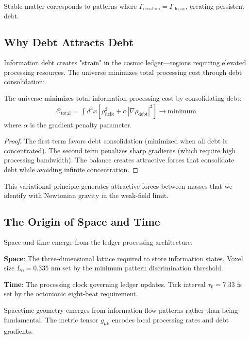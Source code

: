 \documentclass[12pt]{article}
\begin{document}
Stable matter corresponds to patterns where $\Gamma_{\text{creation}} = \Gamma_{\text{decay}}$, creating persistent debt.

\subsection{Why Debt Attracts Debt}

Information debt creates "strain" in the cosmic ledger—regions requiring elevated processing resources. The universe minimizes total processing cost through debt consolidation:

\begin{theorem}
The universe minimizes total information processing cost by consolidating debt:
\begin{align}
\mathcal{C}_{\text{total}} = \int d^3x \left[ \rho_{\text{debt}}^2 + \alpha |\nabla \rho_{\text{debt}}|^2 \right] \to \text{minimum}
\end{align}
where $\alpha$ is the gradient penalty parameter.
\end{theorem}

\begin{proof}
The first term favors debt consolidation (minimized when all debt is concentrated). The second term penalizes sharp gradients (which require high processing bandwidth). The balance creates attractive forces that consolidate debt while avoiding infinite concentration.
\end{proof}

This variational principle generates attractive forces between masses that we identify with Newtonian gravity in the weak-field limit.

\subsection{The Origin of Space and Time}

Space and time emerge from the ledger processing architecture:

\textbf{Space}: The three-dimensional lattice required to store information states. Voxel size $L_0 = 0.335$ nm set by the minimum pattern discrimination threshold.

\textbf{Time}: The processing clock governing ledger updates. Tick interval $\tau_0 = 7.33$ fs set by the octonionic eight-beat requirement.

Spacetime geometry emerges from information flow patterns rather than being fundamental. The metric tensor $g_{\mu\nu}$ encodes local processing rates and debt gradients.
\end{document}
